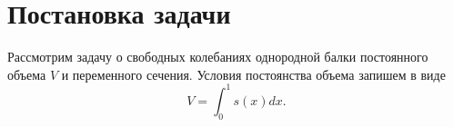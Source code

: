 \section{Постановка задачи}
\label{section:OptimalControlProblem}
%
%
%
%
%
\par
Рассмотрим задачу о свободных колебаниях однородной балки постоянного объема \(V\) и переменного сечения. Условия постоянства объема запишем в виде
\begin{equation} 
\label{Condition:ConstantV}
	V = \int^1_0{s(x)dx}.
\end{equation}
